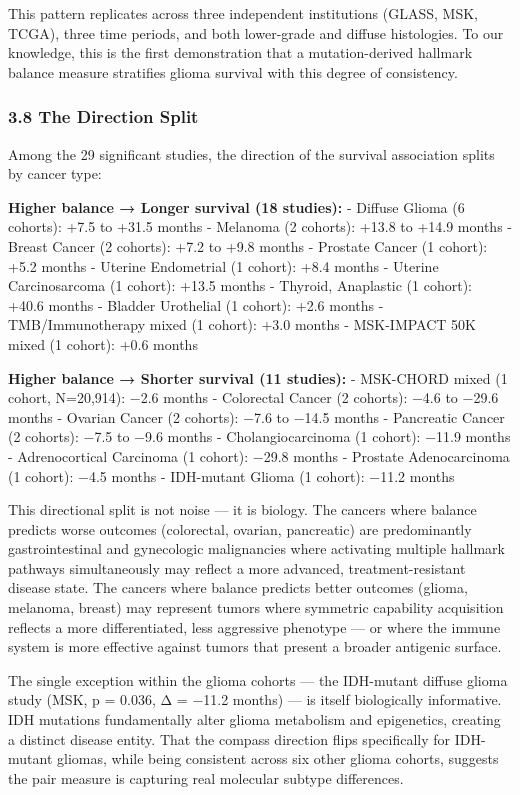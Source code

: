 \documentclass[
  11pt,
]{article}
\begin{document}
This pattern replicates across three independent institutions (GLASS,
MSK, TCGA), three time periods, and both lower-grade and diffuse
histologies. To our knowledge, this is the first demonstration that a
mutation-derived hallmark balance measure stratifies glioma survival
with this degree of consistency.

\subsubsection{3.8 The Direction Split}\label{the-direction-split}

Among the 29 significant studies, the direction of the survival
association splits by cancer type:

\textbf{Higher balance → Longer survival (18 studies):} - Diffuse Glioma
(6 cohorts): +7.5 to +31.5 months - Melanoma (2 cohorts): +13.8 to +14.9
months - Breast Cancer (2 cohorts): +7.2 to +9.8 months - Prostate
Cancer (1 cohort): +5.2 months - Uterine Endometrial (1 cohort): +8.4
months - Uterine Carcinosarcoma (1 cohort): +13.5 months - Thyroid,
Anaplastic (1 cohort): +40.6 months - Bladder Urothelial (1 cohort):
+2.6 months - TMB/Immunotherapy mixed (1 cohort): +3.0 months -
MSK-IMPACT 50K mixed (1 cohort): +0.6 months

\textbf{Higher balance → Shorter survival (11 studies):} - MSK-CHORD
mixed (1 cohort, N=20,914): −2.6 months - Colorectal Cancer (2 cohorts):
−4.6 to −29.6 months - Ovarian Cancer (2 cohorts): −7.6 to −14.5 months
- Pancreatic Cancer (2 cohorts): −7.5 to −9.6 months -
Cholangiocarcinoma (1 cohort): −11.9 months - Adrenocortical Carcinoma
(1 cohort): −29.8 months - Prostate Adenocarcinoma (1 cohort): −4.5
months - IDH-mutant Glioma (1 cohort): −11.2 months

This directional split is not noise --- it is biology. The cancers where
balance predicts worse outcomes (colorectal, ovarian, pancreatic) are
predominantly gastrointestinal and gynecologic malignancies where
activating multiple hallmark pathways simultaneously may reflect a more
advanced, treatment-resistant disease state. The cancers where balance
predicts better outcomes (glioma, melanoma, breast) may represent tumors
where symmetric capability acquisition reflects a more differentiated,
less aggressive phenotype --- or where the immune system is more
effective against tumors that present a broader antigenic surface.

The single exception within the glioma cohorts --- the IDH-mutant
diffuse glioma study (MSK, p = 0.036, Δ = −11.2 months) --- is itself
biologically informative. IDH mutations fundamentally alter glioma
metabolism and epigenetics, creating a distinct disease entity. That the
compass direction flips specifically for IDH-mutant gliomas, while being
consistent across six other glioma cohorts, suggests the pair measure is
capturing real molecular subtype differences.
\end{document}
